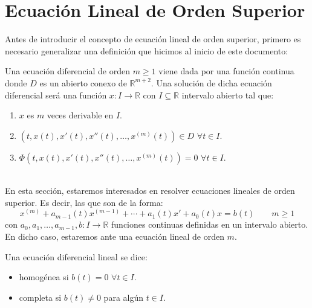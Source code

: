 \newpage
\chapter{Ecuación Lineal de Orden Superior}
Antes de introducir el concepto de ecuación lineal de orden superior, primero es necesario generalizar una definición que hicimos al inicio de este documento:
\begin{definicion}
    Una ecuación diferencial de orden $m\geq 1$ viene dada por una función
    continua donde $D$ es un abierto conexo de $\mathbb{R}^{m+2}$.\newline
    Una solución de dicha ecuación diferencial será una función $x:I\rightarrow\mathbb{R}$ con $I\subseteq \mathbb{R}$ intervalo abierto tal que:
    \begin{enumerate}[label=(\roman*)]
        \item $x$ es $m$ veces derivable en $I$.
        \item $(t,x(t),x'(t),x''(t), \ldots, x^{(m)}(t))\in D$ $\forall t\in I$.
        \item $\Phi(t,x(t),x'(t),x''(t),\ldots,x^{(m)}(t)) = 0$ $\forall t\in I$.
    \end{enumerate}
\end{definicion}~\\

\noindent
En esta sección, estaremos interesados en resolver ecuaciones lineales de orden superior. Es decir, las que son de la forma:
\begin{equation}\label{eq:linealsup}
    x^{(m)} + a_{m-1}(t) x^{(m-1)} + \cdots + a_1(t) x' + a_0(t)x = b(t) \qquad m\geq 1
\end{equation}
con $a_0,a_1,\ldots, a_{m-1},b:I\rightarrow\mathbb{R}$ funciones continuas definidas en un intervalo abierto.\\

\noindent
En dicho caso, estaremos ante una ecuación lineal de orden $m$.

\begin{definicion}
    Una ecuación diferencial lineal se dice: 
    \begin{itemize}
        \item homogénea si $b(t) = 0$ $\forall t\in I$.
        \item completa si $b(t) \neq 0$ para algún $t\in I$.
    \end{itemize}
\end{definicion}

